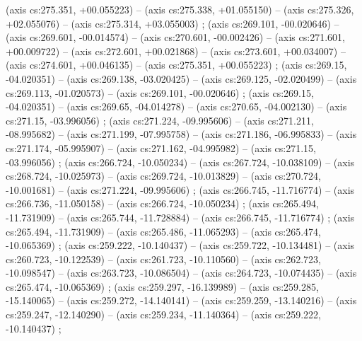     (axis cs:275.351,    +00.055223) --  (axis cs:275.338,    +01.055150) --  (axis cs:275.326,    +02.055076) --  (axis cs:275.314,    +03.055003) ;
    (axis cs:269.101,    -00.020646) --  (axis cs:269.601,    -00.014574) --  (axis cs:270.601,    -00.002426) --  (axis cs:271.601,    +00.009722) --  (axis cs:272.601,    +00.021868) --  (axis cs:273.601,    +00.034007) --  (axis cs:274.601,    +00.046135) --  (axis cs:275.351,    +00.055223) ;
    (axis cs:269.15,    -04.020351) --  (axis cs:269.138,    -03.020425) --  (axis cs:269.125,    -02.020499) --  (axis cs:269.113,    -01.020573) --  (axis cs:269.101,    -00.020646) ;
    (axis cs:269.15,    -04.020351) --  (axis cs:269.65,    -04.014278) --  (axis cs:270.65,    -04.002130) --  (axis cs:271.15,    -03.996056) ;
    (axis cs:271.224,    -09.995606) --  (axis cs:271.211,    -08.995682) --  (axis cs:271.199,    -07.995758) --  (axis cs:271.186,    -06.995833) --  (axis cs:271.174,    -05.995907) --  (axis cs:271.162,    -04.995982) --  (axis cs:271.15,    -03.996056) ;
    (axis cs:266.724,    -10.050234) --  (axis cs:267.724,    -10.038109) --  (axis cs:268.724,    -10.025973) --  (axis cs:269.724,    -10.013829) --  (axis cs:270.724,    -10.001681) --  (axis cs:271.224,    -09.995606) ;
    (axis cs:266.745,    -11.716774) --  (axis cs:266.736,    -11.050158) --  (axis cs:266.724,    -10.050234) ;
    (axis cs:265.494,    -11.731909) --  (axis cs:265.744,    -11.728884) --  (axis cs:266.745,    -11.716774) ;
    (axis cs:265.494,    -11.731909) --  (axis cs:265.486,    -11.065293) --  (axis cs:265.474,    -10.065369) ;
    (axis cs:259.222,    -10.140437) --  (axis cs:259.722,    -10.134481) --  (axis cs:260.723,    -10.122539) --  (axis cs:261.723,    -10.110560) --  (axis cs:262.723,    -10.098547) --  (axis cs:263.723,    -10.086504) --  (axis cs:264.723,    -10.074435) --  (axis cs:265.474,    -10.065369) ;
    (axis cs:259.297,    -16.139989) --  (axis cs:259.285,    -15.140065) --  (axis cs:259.272,    -14.140141) --  (axis cs:259.259,    -13.140216) --  (axis cs:259.247,    -12.140290) --  (axis cs:259.234,    -11.140364) --  (axis cs:259.222,    -10.140437) ;
